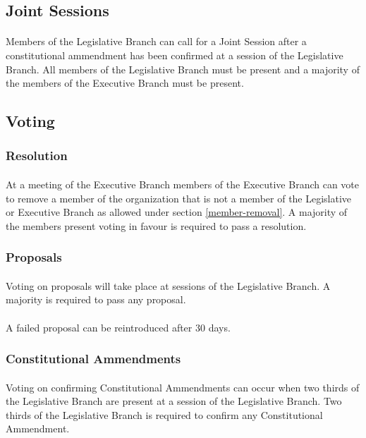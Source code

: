 \documentclass[10pt,a4paper]{article}
\begin{document}
\subsection{Joint Sessions}
\paragraph{}
Members of the Legislative Branch can call for a Joint Session after a constitutional ammendment has been confirmed at a session of the Legislative Branch. All members of the Legislative Branch must be present and a majority of the members of the Executive Branch must be present.
\subsection{Voting}
\subsubsection{Resolution}
\paragraph{}
At a meeting of the Executive Branch members of the Executive Branch can vote to remove a member of the organization that is not a member of the Legislative or Executive Branch as allowed under section \ref{member-removal}. A majority of the members present voting in favour is required to pass a resolution.
\subsubsection{Proposals}
\paragraph{}
Voting on proposals will take place at sessions of the Legislative Branch. A majority is required to pass any proposal.
\paragraph{}
A failed proposal can be reintroduced after 30 days.
\subsubsection{Constitutional Ammendments}
\paragraph{}
Voting on confirming Constitutional Ammendments can occur when two thirds of the Legislative Branch are present at a session of the Legislative Branch. Two thirds of the Legislative Branch is required to confirm any Constitutional Ammendment.
\end{document}
